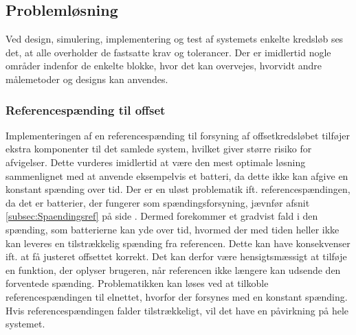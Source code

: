 \subsection{Problemløsning}
Ved design, simulering, implementering og test af systemets enkelte kredsløb ses det, at alle overholder de fastsatte krav og tolerancer. Der er imidlertid nogle områder indenfor de enkelte blokke, hvor det kan overvejes, hvorvidt andre målemetoder og designs kan anvendes.

\subsubsection{Referencespænding til offset}
Implementeringen af en referencespænding til forsyning af offsetkredsløbet tilføjer ekstra komponenter til det samlede system, hvilket giver større risiko for afvigelser. Dette vurderes imidlertid at være den mest optimale løsning sammenlignet med at anvende eksempelvis et batteri, da dette ikke kan afgive en konstant spænding over tid. Der er en uløst problematik ift. referencespændingen, da det er batterier, der fungerer som spændingsforsyning, jævnfør afsnit \ref{subsec:Spaendingsref} på side \pageref{subsec:Spaendingsref}. Dermed forekommer et gradvist fald i den spænding, som batterierne kan yde over tid, hvormed der med tiden heller ikke kan leveres en tilstrækkelig spænding fra referencen. Dette kan have konsekvenser ift. at få justeret offsettet korrekt. Det kan derfor være hensigtsmæssigt at tilføje en funktion, der oplyser brugeren, når referencen ikke længere kan udsende den forventede spænding. Problematikken kan løses ved at tilkoble referencespændingen til elnettet, hvorfor der forsynes med en konstant spænding. Hvis referencespændingen falder tilstrækkeligt, vil det have en påvirkning på hele systemet. %

